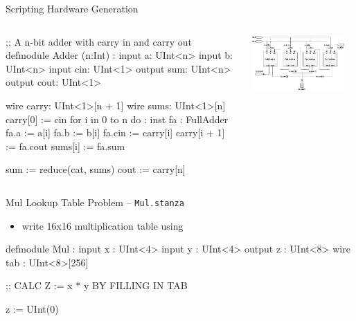 \documentclass[xcolor=pdflatex,dvipsnames,table]{beamer}
\begin{document}
\begin{frame}[fragile]{Scripting Hardware Generation}

\begin{columns}

{
\begin{stanza}
;; A n-bit adder with carry in and carry out
defmodule Adder (n:Int) :
   input  a:    UInt<n>
   input  b:    UInt<n>
   input  cin:  UInt<1>
   output sum:  UInt<n>
   output cout: UInt<1>

   wire carry: UInt<1>[n + 1]
   wire sums: UInt<1>[n]
   carry[0] := cin
   for i in 0 to n do :
      inst fa : FullAdder
      fa.a := a[i]
      fa.b := b[i]
      fa.cin := carry[i]
      carry[i + 1] := fa.cout
      sums[i] := fa.sum

   sum := reduce(cat, sums)
   cout := carry[n]
\end{stanza}
}


\begin{center}
\includegraphics[width=0.9\textwidth]{../getting-started/figs/4_Bit_Adder.jpg}
\end{center}
\end{columns}

\end{frame}

% 

\begin{frame}[fragile]{Mul Lookup Table Problem -- \tt Mul.stanza}
\begin{itemize}
\item write 16x16 multiplication table using 
\end{itemize}
\begin{stanza}
defmodule Mul :
  input x : UInt<4>
  input y : UInt<4>
  output z : UInt<8>
  wire tab : UInt<8>[256]

  ;; CALC Z := x * y BY FILLING IN TAB

  z := UInt(0)
\end{stanza}

\end{frame}
\end{document}
